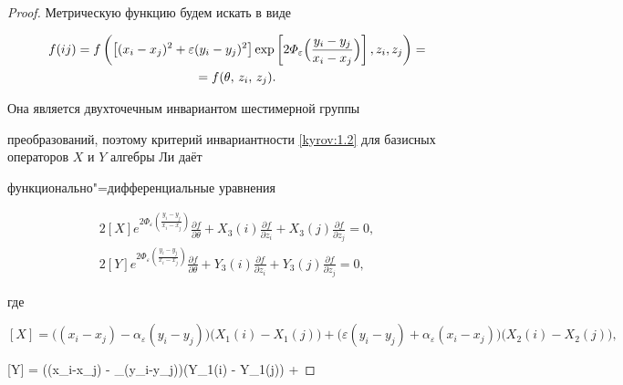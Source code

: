 \begin{proof}

Метрическую функцию будем искать в виде

\begin{multline}

\label{kyrov:3.1}

f(ij) = f\left(\bigl[(x_i - x_j)^2 + \varepsilon(y_i -

y_j)^2\bigr]\exp\left[2\varPhi_{\varepsilon}\Bigl(\frac{y_i-y_j}{x_i-x_j}\Bigr)\right],z_i,z_j\right)

= \\

=f(\theta,\,z_i,\,z_j).

\end{multline}

Она является двухточечным инвариантом шестимерной группы

преобразований, поэтому критерий инвариантности \eqref{kyrov:1.2} для базисных операторов $X$ и $Y$ алгебры Ли даёт

функционально"=дифферен\-циальные  уравнения

\begin{gather}

\label{kyrov:3.2}

2[X]e^{2\varPhi_{\varepsilon}\left(\frac{y_i-y_j}{x_i-x_j}\right)}\frac{\partial

f}{\partial \theta}+  X_{3}(i)\frac{\partial f}{\partial z_i} +

X_{3}(j)\frac{\partial f}{\partial z_j} =

0,\\

\label{kyrov:3.3}

 2[Y]e^{2\varPhi_{\varepsilon}\left(\frac{y_i-y_j}{x_i-x_j}\right)}\frac{\partial

f}{\partial \theta}+ Y_{3}(i)\frac{\partial f}{\partial z_i} +

Y_{3}(j)\frac{\partial f}{\partial z_j} =

0,

\end{gather}

где 

$$[X] {=} \bigl((x_i-x_j) - \alpha_{\varepsilon}(y_i-y_j)\bigr)\bigl(X_1(i) - X_1(j)\bigr) +

\bigl(\varepsilon(y_i-y_j) + \alpha_{\varepsilon}(x_i - x_j)\bigr)\bigl(X_2(i) - X_2(j)\bigr),$$ 

$$[Y] = \bigl((x_i-x_j) - \alpha_{\varepsilon}(y_i-y_j)\bigr)\bigl(Y_1(i) - Y_1(j)\bigr) +


\end{proof}
